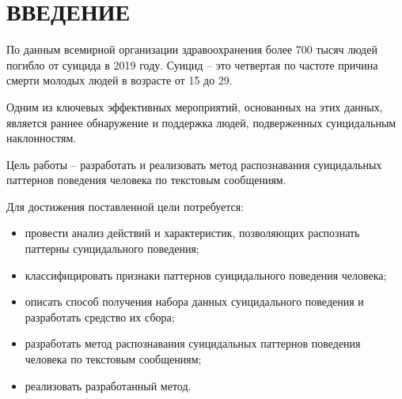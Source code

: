 \section*{ВВЕДЕНИЕ}

По данным всемирной организации здравоохранения более 700 тысяч людей погибло от суицида в 2019 году. Суицид -- это четвертая по частоте причина смерти молодых людей в возрасте от 15 до 29. \cite{suicideVOZ}

Одним из ключевых эффективных мероприятий, основанных на этих данных, является раннее обнаружение и поддержка людей, подверженных суицидальным наклонностям.

Цель работы -- разработать и реализовать метод распознавания суицидальных паттернов поведения человека по текстовым сообщениям.

Для достижения поставленной цели потребуется:
\begin{itemize}
	\item провести анализ действий и характеристик, позволяющих распознать паттерны суицидального поведения;
	\item классифицировать признаки паттернов суицидального поведения человека;
	\item описать способ получения набора данных суицидального поведения и разработать средство их сбора;
	\item разработать метод распознавания суицидальных паттернов поведения человека по текстовым сообщениям;
	\item реализовать разработанный метод.
\end{itemize}

\pagebreak